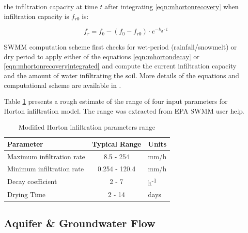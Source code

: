 the infiltration capacity at time $t$ after integrating \ref{eqn:mhortonrecovery} when infiltration capacity is $f_{r0}$ is:

\begin{equation}
\label{eqn:mhortonrecoveryintegrated}
f_r =  f_0 - (f_0 - f_{r0}) \cdot e^{-k_d \cdot t}
\end{equation}
    
SWMM computation scheme first checks for wet-period (rainfall/snowmelt) or dry period to apply either of the equations \ref{eqn:mhortondecay} or \ref{eqn:mhortonrecoveryintegrated}  and compute the current infiltration capacity and the amount of water infiltrating the soil. More details of the equations and computational scheme are available in \citet{Rossman2016}.

Table \ref{tbl:infparam} presents a rough estimate of the range of four input parameters for Horton infiltration model. The range was extracted from EPA SWMM user help. 
 

\begin{table}[h]
\caption{Modified Horton infiltration parameters range\cite{Rossman2016}}
\label{tbl:infparam}
\centering
\begin{tabular}{@{}lcll@{}}
\toprule
\textbf{Parameter}        & \multicolumn{2}{c}{\textbf{Typical Range}} & \textbf{Units}        \\ \midrule
Maximum infiltration rate & \multicolumn{2}{c}{8.5 - 254}              & mm/h                  \\
Minimum infiltration rate & \multicolumn{2}{c}{0.254 - 120.4}          & mm/h                  \\
Decay coefficient         & \multicolumn{2}{c}{2 - 7}                  & h\textsuperscript{-1}\\
Drying Time               & \multicolumn{2}{c}{2 - 14}                 & days                  \\ \bottomrule
\end{tabular}
\end{table}



\subsection{Aquifer \& Groundwater Flow} \label{groundwater}
 
